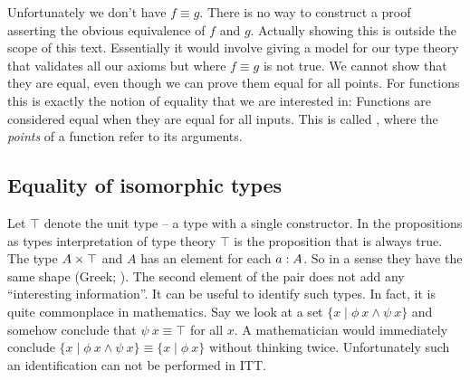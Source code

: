 Unfortunately we don't have $f \equiv g$. There is no way to construct
a proof asserting the obvious equivalence of $f$ and $g$. Actually
showing this is outside the scope of this text. Essentially it would
involve giving a model for our type theory that validates all our
axioms but where $f \equiv g$ is not true. We cannot show that they
are equal, even though we can prove them equal for all points. For
functions this is exactly the notion of equality that we are
interested in: Functions are considered equal when they are equal for
all inputs. This is called , where the
\emph{points} of a function refer to its arguments.

%
\subsection{Equality of isomorphic types}
%
Let $\top$ denote the unit type -- a type with a single constructor.
In the propositions as types interpretation of type theory $\top$ is
the proposition that is always true. The type $A \times \top$ and $A$ has
an element for each $a \mathrel{:} A$. So in a sense they have the same shape
(Greek;
). The second element of the pair does not
add any ``interesting information''. It can be useful to identify such
types. In fact, it is quite commonplace in mathematics. Say we look at
a set $\{x \mid \phi\ x \land \psi\ x\}$ and somehow conclude that
$\psi\ x \equiv \top$ for all $x$. A mathematician would immediately
conclude $\{x \mid \phi\ x \land \psi\ x\} \equiv \{x \mid \phi\ x\}$
without thinking twice. Unfortunately such an identification can not
be performed in ITT.

